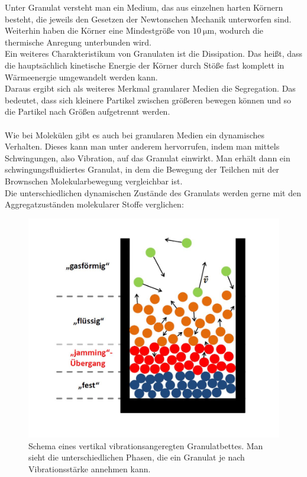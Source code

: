 Unter Granulat versteht man ein Medium, das aus einzelnen harten Körnern besteht, die jeweils den Gesetzen der Newtonschen Mechanik unterworfen sind. Weiterhin haben die Körner eine Mindestgröße von $\SI{10}{\micro\meter}$, wodurch die thermische Anregung unterbunden wird. \\
Ein weiteres Charakteristikum von Granulaten ist die Dissipation. Das heißt, dass die hauptsächlich kinetische Energie der Körner durch Stöße fast komplett in Wärmeenergie umgewandelt werden kann. \cite{DLRWebsite} \\
Daraus ergibt sich als weiteres Merkmal granularer Medien die Segregation. Das bedeutet, dass sich kleinere Partikel zwischen größeren bewegen können und so die Partikel nach Größen aufgetrennt werden. \cite{PhysikimKontext} \\
\hfill \\ 
Wie bei Molekülen gibt es auch bei granularen Medien ein dynamisches Verhalten. Dieses kann man unter anderem hervorrufen, indem man mittels Schwingungen, also Vibration, auf das Granulat einwirkt. Man erhält dann ein schwingungsfluidiertes Granulat, in dem die Bewegung der Teilchen mit der Brownschen Molekularbewegung vergleichbar ist. \\
Die unterschiedlichen dynamischen Zustände des Granulats werden gerne mit den Aggregatzuständen molekularer Stoffe verglichen:


\begin{center}
\begin{figure}[h]
	\includegraphics[scale=0.45]{Einleitung_1.jpg}
	\caption[Phasen im Wirbelbett]{Schema eines vertikal vibrationsangeregten Granulatbettes. Man sieht die unterschiedlichen Phasen, die ein Granulat je nach Vibrationsstärke annehmen kann. \cite{Darmstadt2015}}
\end{figure}	
\end{center}

